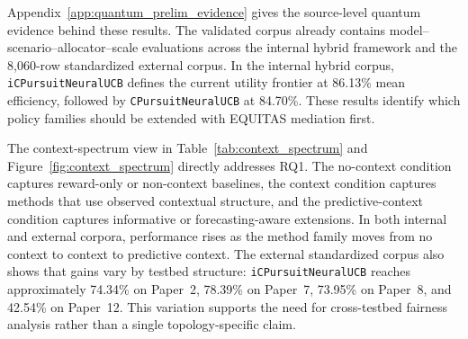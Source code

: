 \documentclass[conference]{IEEEtran}
\begin{document}

Appendix~\ref{app:quantum_prelim_evidence} gives the source-level quantum
evidence behind these results. The validated corpus already contains
model--scenario--allocator--scale evaluations across the internal hybrid
framework and the 8,060-row standardized external corpus. In the internal
hybrid corpus, \texttt{iCPursuitNeuralUCB} defines the current utility
frontier at 86.13\% mean efficiency, followed by
\texttt{CPursuitNeuralUCB} at 84.70\%. These results identify which policy
families should be extended with EQUITAS mediation first.

The context-spectrum view in Table~\ref{tab:context_spectrum} and
Figure~\ref{fig:context_spectrum} directly addresses RQ1. The no-context
condition captures reward-only or non-context baselines, the context condition
captures methods that use observed contextual structure, and the
predictive-context condition captures informative or forecasting-aware
extensions. In both internal and external corpora, performance rises as the
method family moves from no context to context to predictive context. The
external standardized corpus also shows that gains vary by testbed structure:
\texttt{iCPursuitNeuralUCB} reaches approximately 74.34\% on Paper~2, 78.39\%
on Paper~7, 73.95\% on Paper~8, and 42.54\% on Paper~12. This variation
supports the need for cross-testbed fairness analysis rather than a single
topology-specific claim.
\end{document}
